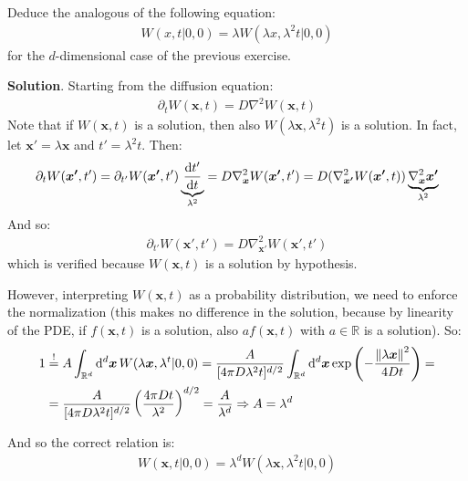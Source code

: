 \documentclass[../template.tex]{subfiles}
\begin{document}
\begin{exo}
    Deduce the analogous of the following equation:
    \begin{align*}
        W(x,t|0,0) = \lambda W(\lambda x, \lambda^2 t|0,0)
    \end{align*}
    for the $d$-dimensional case of the previous exercise.

    \medskip

    \textbf{Solution}. Starting from the diffusion equation:
    \begin{align*}
        \partial_t W(\bm{x},t) = D \nabla^2 W(\bm{x},t)
    \end{align*}
    Note that if $W(\bm{x},t)$ is a solution, then also $W(\lambda\bm{x}, \lambda^2 t)$ is a solution. In fact, let $\bm{x'} = \lambda \bm{x}$ and $t' = \lambda^2 t$. Then:
    \begin{align*}
        \partial_t W(\bm{x'},t') = \partial_{t'} W(\bm{x'}, t') \underbrace{\dv{t'}{t}}_{\lambda^2} = D \nabla^2_{\bm{x}} W(\bm{x'},t') = D (\nabla_{\bm{x'}}^2 W(\bm{x'},t))\underbrace{ \nabla^2_{\bm{x}} \bm{x'}}_{\lambda^2} 
    \end{align*}
    And so:
    \begin{align*}
        \partial_{t'} W(\bm{x'},t') = D \nabla_{\bm{x'}}^2 W(\bm{x'},t')
    \end{align*}
    which is verified because $W(\bm{x},t)$ is a solution by hypothesis.

    \medskip

    However, interpreting $W(\bm{x},t)$ as a probability distribution, we need to enforce the normalization (this makes no difference in the solution, because by linearity of the PDE, if $f(\bm{x},t)$ is a solution, also $a f(\bm{x},t)$ with $a \in \mathbb{R}$ is a solution). So:
    \begin{align*}
        1 &\overset{!}{=}  A \int_{\mathbb{R}^d} \dd[d]{\bm{x}} W(\lambda \bm{x}, \lambda^t|0,0) = \frac{A}{[4 \pi D \lambda^2 t]^{d/2}}  \int_{\mathbb{R}^d} \dd[d]{\bm{x}} \exp\left(-\frac{\norm{\lambda \bm{x}}^2}{4 Dt} \right) =\\
        &= \frac{A}{[4 \pi D \lambda^2 t]^{d/2}}  \left(\frac{4 \pi D t}{\lambda^2} \right)^{d/2} = \frac{A}{\lambda^d} \Rightarrow A = \lambda^d 
    \end{align*}

    And so the correct relation is:
    \begin{align*}
        W(\bm{x},t|0,0) = \lambda^d W(\lambda \bm{x}, \lambda^2 t|0,0)
    \end{align*}
\end{exo}
\end{document}
